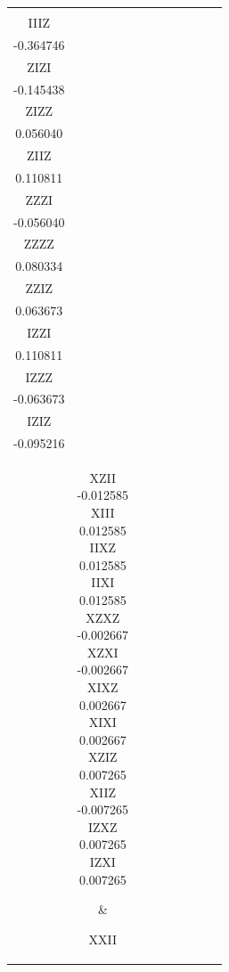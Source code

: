 \documentclass[twocolumn]{revtex4-1}
\newcommand{\1}{\mathbbm{1}}
\begin{document}
\begin{longtable}{|c|c|c|c|c|c|c|c|c|}
{-0.206128\\ 
IIIZ\\
-0.364746\\ 
ZIZI\\
-0.145438\\ 
ZIZZ\\
0.056040\\ 
ZIIZ\\
0.110811\\ 
ZZZI\\
-0.056040\\ 
ZZZZ\\
0.080334\\ 
ZZIZ\\
0.063673\\ 
IZZI\\
0.110811\\ 
IZZZ\\
-0.063673\\ 
IZIZ\\
-0.095216\\ 
\vspace{.5\baselineskip}}
&
\parbox{1.9cm}{\centering\vspace{.5\baselineskip}
XZII\\
-0.012585\\ 
XIII\\
0.012585\\ 
IIXZ\\
0.012585\\ 
IIXI\\
0.012585\\ 
XZXZ\\
-0.002667\\ 
XZXI\\
-0.002667\\ 
XIXZ\\
0.002667\\ 
XIXI\\
0.002667\\ 
XZIZ\\
0.007265\\ 
XIIZ\\
-0.007265\\ 
IZXZ\\
0.007265\\ 
IZXI\\
0.007265\\ 
\vspace{.5\baselineskip}}
&
\parbox{1.9cm}{\centering\vspace{.5\baselineskip}
XXII\\
}
\end{longtable}
\end{document}
